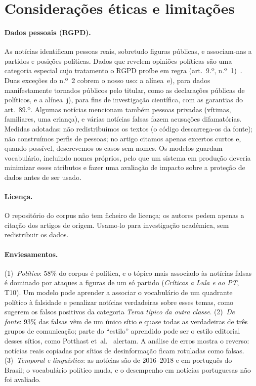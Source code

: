 \section{Considerações éticas e limitações}\label{sec:etica}

\paragraph{Dados pessoais (RGPD).}
As notícias identificam pessoas reais, sobretudo figuras públicas, e associam-nas a partidos e
posições políticas. Dados que revelem opiniões políticas são uma categoria especial cujo tratamento
o RGPD proíbe em regra (art.~9.º, n.º~1)~\cite{rgpd2016}. Duas exceções do n.º~2 cobrem o nosso uso:
a alínea~e), para dados manifestamente tornados públicos pelo titular, como as declarações públicas
de políticos, e a alínea~j), para fins de investigação científica, com as garantias do art.~89.º.
Algumas notícias mencionam também pessoas privadas (vítimas, familiares, uma criança), e várias
notícias falsas fazem acusações difamatórias. Medidas adotadas: não redistribuímos os textos (o
código descarrega-os da fonte); não construímos perfis de pessoas; no artigo citamos apenas excertos
curtos e, quando possível, descrevemos os casos sem nomes. Os modelos guardam vocabulário, incluindo
nomes próprios, pelo que um sistema em produção deveria minimizar esses atributos e fazer uma
avaliação de impacto sobre a proteção de dados antes de ser usado.

\paragraph{Licença.}
O repositório do corpus não tem ficheiro de licença; os autores pedem apenas a citação dos artigos
de origem. Usamo-lo para investigação académica, sem redistribuir os dados.

\paragraph{Enviesamentos.}
(1)~\emph{Político}: 58\% do corpus é política, e o tópico mais associado às notícias falsas é dominado
por ataques a figuras de um só partido (\emph{Críticas a Lula e ao PT}, T10). Um modelo pode aprender
a associar o vocabulário de um quadrante político à falsidade e penalizar notícias verdadeiras sobre
esses temas, como sugerem os falsos positivos da categoria \emph{Tema típico da outra classe}.
(2)~\emph{De fonte}: 93\% das falsas vêm de um único sítio e quase todas as verdadeiras de três grupos
de comunicação; parte do ``estilo'' aprendido pode ser o estilo editorial desses sítios, como
Potthast et~al.~\cite{potthast2018} alertam. A análise de erros mostra o reverso: notícias reais
copiadas por sítios de desinformação ficam rotuladas como falsas. (3)~\emph{Temporal e linguístico}:
as notícias são de 2016--2018 e em português do Brasil; o vocabulário político muda, e o desempenho
em notícias portuguesas não foi avaliado.

